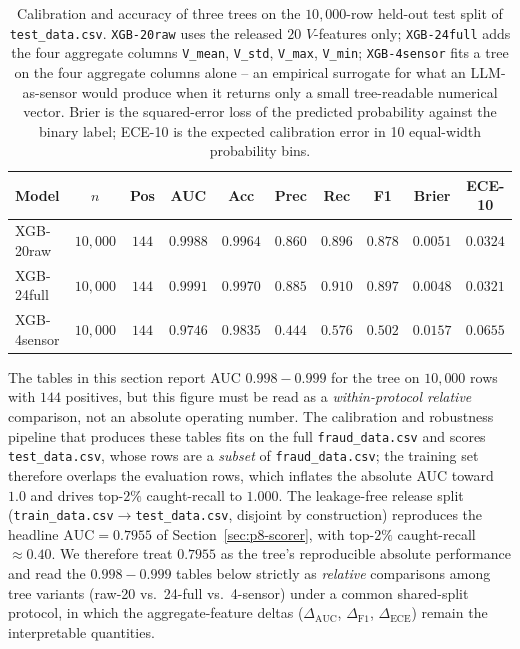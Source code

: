 \documentclass{article}
\providecommand{\secref}[1]{Section~\ref{#1}}
\begin{document}
\begin{table}[t]
\centering
\small
\caption{Calibration and accuracy of three trees on the $10{,}000$-row
held-out test split of \texttt{test\_data.csv}. \texttt{XGB-20raw} uses
the released $20$ $V$-features only; \texttt{XGB-24full} adds the four
aggregate columns \texttt{V\_mean}, \texttt{V\_std}, \texttt{V\_max},
\texttt{V\_min}; \texttt{XGB-4sensor} fits a tree on the four aggregate
columns alone -- an empirical surrogate for what an LLM-as-sensor would
produce when it returns only a small tree-readable numerical vector.
Brier is the squared-error loss of the predicted probability against
the binary label; ECE-10 is the expected calibration error in 10
equal-width probability bins.}
\label{tab:p8-evidence-cal}
\begin{tabular}{lccccccccc}
\toprule
Model & $n$ & Pos & AUC & Acc & Prec & Rec & F1 & Brier & ECE-10 \\
\midrule
XGB-20raw    & $10{,}000$ & $144$ & $0.9988$ & $0.9964$ & $0.860$ & $0.896$ & $0.878$ & $0.0051$ & $0.0324$ \\
XGB-24full   & $10{,}000$ & $144$ & $0.9991$ & $0.9970$ & $0.885$ & $0.910$ & $0.897$ & $0.0048$ & $0.0321$ \\
XGB-4sensor  & $10{,}000$ & $144$ & $0.9746$ & $0.9835$ & $0.444$ & $0.576$ & $0.502$ & $0.0157$ & $0.0655$ \\
\bottomrule
\end{tabular}
\end{table}

The tables in this section report AUC $0.998{-}0.999$ for the tree on
$10{,}000$ rows with $144$ positives, but this figure must be read as a
\emph{within-protocol relative} comparison, not an absolute operating
number. The calibration and robustness pipeline that produces these tables
fits on the full \texttt{fraud\_data.csv} and scores
\texttt{test\_data.csv}, whose rows are a \emph{subset} of
\texttt{fraud\_data.csv}; the training set therefore overlaps the
evaluation rows, which inflates the absolute AUC toward $1.0$ and drives
top-$2\%$ caught-recall to $1.000$. The leakage-free release split
(\texttt{train\_data.csv}$\to$\texttt{test\_data.csv}, disjoint by
construction) reproduces the headline $\mathrm{AUC}{=}0.7955$ of
\secref{sec:p8-scorer}, with top-$2\%$ caught-recall $\approx 0.40$. We
therefore treat $0.7955$ as the tree's reproducible absolute performance
and read the $0.998{-}0.999$ tables below strictly as \emph{relative}
comparisons among tree variants (raw-20 vs.\ 24-full vs.\ 4-sensor) under a
common shared-split protocol, in which the aggregate-feature deltas
($\Delta_{\mathrm{AUC}}$, $\Delta_{\mathrm{F1}}$, $\Delta_{\mathrm{ECE}}$)
remain the interpretable quantities.
\end{document}
